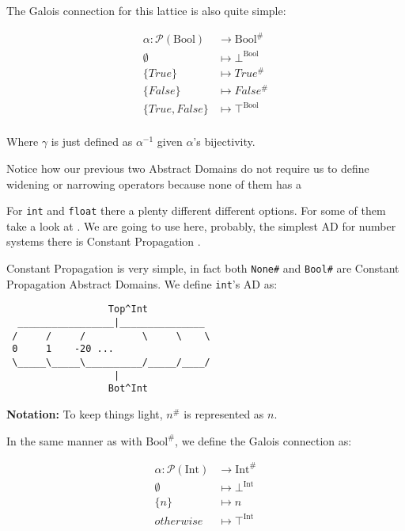 The Galois connection for this lattice is also quite simple:

\begin{align*}
  \alpha \colon \mathcal{P}(\text{Bool}) &\to \text{Bool}^{\#} \\
  \emptyset &\mapsto \bot^{\text{Bool}} \\
  \{True\} &\mapsto True^{\#} \\
  \{False\} &\mapsto False^{\#} \\
  \{True,False\} &\mapsto \top^{\text{Bool}} \\
\end{align*}

Where \(\gamma{}\) is just defined as \(\alpha^{-1}\) given
\(\alpha{}\)'s bijectivity.

Notice how our previous two Abstract Domains do not require us to define
widening or narrowing operators because none of them has a

For \texttt{int} and \texttt{float} there a plenty different different
options. For some of them take a look at {}. We are going to use here, probably, the simplest AD for number
systems there is Constant Propagation {}.

Constant Propagation is very simple, in fact both \texttt{None\#} and
\texttt{Bool\#} are Constant Propagation Abstract Domains. We define
\texttt{int}'s AD as:

{}

\begin{verbatim}
                  Top^Int
  _________________|_______________
 /     /     /          \     \    \
 0     1    -20 ...
 \_____\_____\__________/_____/____/
                   |
                  Bot^Int
\end{verbatim}

\textbf{Notation:} To keep things light, \(n^{\#}\) is represented as
\(n\).

In the same manner as with \(\text{Bool}^{\#}\), we define the Galois
connection as:

\begin{align*}
  \alpha \colon \mathcal{P}(\text{Int}) &\to \text{Int}^{\#} \\
  \emptyset &\mapsto \bot^{\text{Int}} \\
  \{n\} &\mapsto n \\
  otherwise &\mapsto \top^{\text{Int}} \\
\end{align*}

